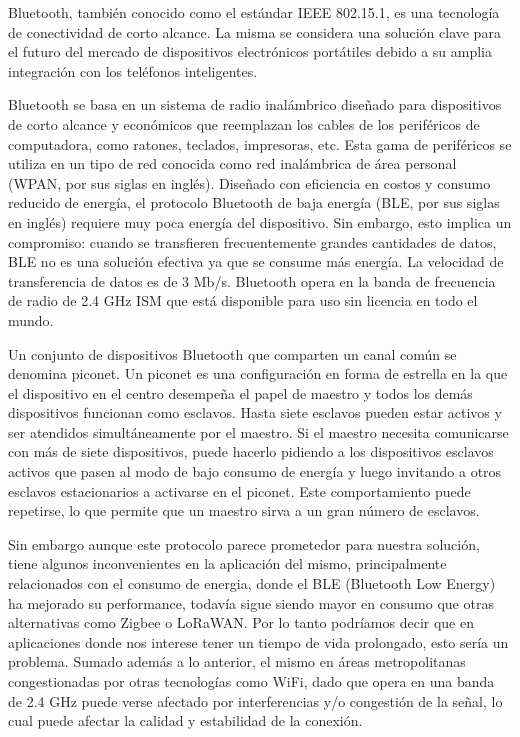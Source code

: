 Bluetooth, también conocido como el estándar IEEE 802.15.1, es una tecnología de conectividad de corto alcance. La misma se considera una solución clave para el futuro del mercado de dispositivos electrónicos portátiles debido a su amplia integración con los teléfonos inteligentes. 

Bluetooth se basa en un sistema de radio inalámbrico diseñado para dispositivos de corto alcance y económicos que reemplazan los cables de los periféricos de computadora, como ratones, teclados, impresoras, etc. Esta gama de periféricos se utiliza en un tipo de red conocida como red inalámbrica de área personal (WPAN, por sus siglas en inglés). Diseñado con eficiencia en costos y consumo reducido de energía, el protocolo Bluetooth de baja energía (BLE, por sus siglas en inglés) requiere muy poca energía del dispositivo. Sin embargo, esto implica un compromiso: cuando se transfieren frecuentemente grandes cantidades de datos, BLE no es una solución efectiva ya que se consume más energía. La velocidad de transferencia de datos es de 3 Mb/s. Bluetooth opera en la banda de frecuencia de radio de 2.4 GHz ISM que está disponible para uso sin licencia en todo el mundo. 

Un conjunto de dispositivos Bluetooth que comparten un canal común se denomina piconet. Un piconet es una configuración en forma de estrella en la que el dispositivo en el centro desempeña el papel de maestro y todos los demás dispositivos funcionan como esclavos. Hasta siete esclavos pueden estar activos y ser atendidos simultáneamente por el maestro. Si el maestro necesita comunicarse con más de siete dispositivos, puede hacerlo pidiendo a los dispositivos esclavos activos que pasen al modo de bajo consumo de energía y luego invitando a otros esclavos estacionarios a activarse en el piconet. Este comportamiento puede repetirse, lo que permite que un maestro sirva a un gran número de esclavos. 

Sin embargo aunque este protocolo parece prometedor para nuestra solución, tiene algunos inconvenientes en la aplicación del mismo, principalmente relacionados con el consumo de energia, donde el BLE (Bluetooth Low Energy) ha mejorado su performance, todavía sigue siendo mayor en consumo que otras alternativas como Zigbee o LoRaWAN. Por lo tanto podríamos decir que en aplicaciones donde nos interese tener un tiempo de vida prolongado, esto sería un problema. Sumado además a lo anterior, el mismo en áreas metropolitanas congestionadas por otras tecnologías como WiFi, dado que opera en una banda de 2.4 GHz puede verse afectado por interferencias y/o congestión de la señal, lo cual puede afectar la calidad y estabilidad de la conexión.

